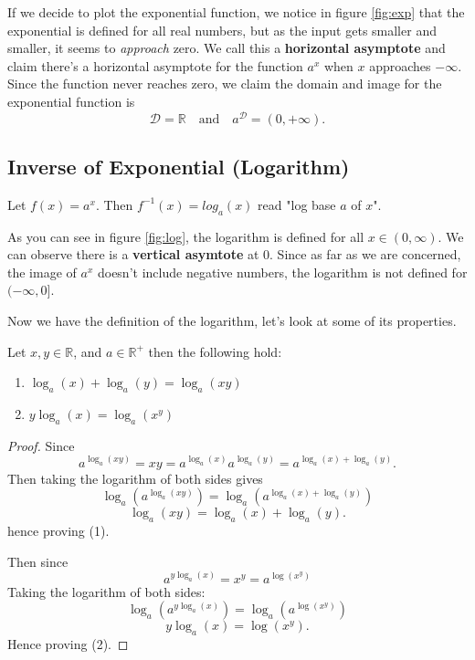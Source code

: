 \documentclass[11pt]{article}
\numberwithin{lemma}{section}
\numberwithin{equation}{section}
\numberwithin{define}{section}
\numberwithin{prop}{section}
\numberwithin{figure}{section}
\numberwithin{theorem}{section}
\numberwithin{cor}{section}
\newcounter{ex}[section]
\numberwithin{ex}{section}
\def\real{\mathbb{R}}
\def\jand{\quad\text{and}\quad}
\begin{document}
If we decide to plot the exponential function, we notice in figure \eqref{fig:exp} that the exponential is defined for all real numbers, but as the input gets smaller and smaller, it seems to \textit{approach} zero. We call this a \textbf{horizontal asymptote} and claim there's a horizontal asymptote for the function $a^x$ when $x$ approaches $-\infty$. Since the function never reaches zero, we claim the domain and image for the exponential function is
$$\mathcal{D}=\real \jand a^\mathcal{D}=(0,+\infty).$$

\subsection{Inverse of Exponential (Logarithm)}
\begin{define}
	Let $f(x)=a^x$. Then $f^{-1}(x)=log_a(x)$ read "log base $a$ of $x$".\footnotemark
\end{define}
\begin{figure}[h]
	\centering
	\caption{}
	\label{fig:log}
\end{figure}
As you can see in figure \eqref{fig:log}, the logarithm is defined for all $x\in(0,\infty)$. We can observe there is a \textbf{vertical asymtote} at $0$.
Since as far as we are concerned, the image of $a^x$ doesn't include negative numbers, the logarithm is not defined for $(-\infty,0]$.

Now we have the definition of the logarithm, let's look at some of its properties.
\begin{theorem}
	Let $x,y\in\real$, and $a\in\real^{+}$ then the following hold:
	\begin{enumerate}
		\item $\log_a(x)+\log_a(y)=\log_a(xy)$
		\item $y\log_a(x)=\log_a(x^y)$
	\end{enumerate}
\end{theorem}
\begin{proof}
	Since
	$$a^{\log_a(xy)}=xy=a^{\log_a(x)}a^{\log_a(y)}=a^{\log_a(x)+\log_a(y)}.$$
	Then taking the logarithm of both sides gives
	$$\log_a(a^{\log_a(xy)})=\log_a(a^{\log_a(x)+\log_a(y)})$$
	$$\log_a(xy)=\log_a(x)+\log_a(y).$$
	hence proving (1).
	
	Then since
	$$a^{y\log_a(x)}=x^y=a^{\log(x^y)}$$
	Taking the logarithm of both sides:
	$$\log_a(a^{y\log_a(x)})=\log_a(a^{\log(x^y)})$$
	$$y\log_a(x)=\log(x^y).$$
	Hence proving (2).
\end{proof}
\end{document}
